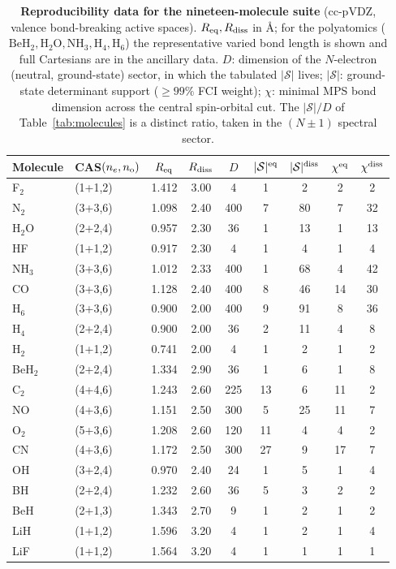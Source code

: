 \begin{table}[htbp]\centering\small
\caption{\textbf{Reproducibility data for the nineteen-molecule suite} (cc-pVDZ, valence bond-breaking
active spaces). $R_{\rm eq},R_{\rm diss}$ in \AA{}; for the polyatomics ($\mathrm{BeH_2},\mathrm{H_2O},
\mathrm{NH_3},\mathrm{H_4},\mathrm{H_6}$) the representative varied bond length is shown and full
Cartesians are in the ancillary data. $D$: dimension of the $N$-electron (neutral, ground-state) sector,
in which the tabulated $|\mathcal S|$ lives; $|\mathcal S|$: ground-state determinant support ($\ge99\%$
FCI weight); $\chi$: minimal MPS bond dimension across the central spin-orbital cut. The $|\mathcal S|/D$
of Table~\ref{tab:molecules} is a distinct ratio, taken in the $(N{\pm}1)$ spectral sector.}
\label{tab:repro}
\begin{tabular}{llccccccc}\hline\hline
Molecule & CAS$(n_e,n_{\rm o})$ & $R_{\rm eq}$ & $R_{\rm diss}$ & $D$ & $|\mathcal S|^{\rm eq}$ & $|\mathcal S|^{\rm diss}$ & $\chi^{\rm eq}$ & $\chi^{\rm diss}$ \\ \hline
F$_2$ & (1+1,2) & 1.412 & 3.00 & 4 & 1 & 2 & 2 & 2 \\
N$_2$ & (3+3,6) & 1.098 & 2.40 & 400 & 7 & 80 & 7 & 32 \\
H$_2$O & (2+2,4) & 0.957 & 2.30 & 36 & 1 & 13 & 1 & 13 \\
HF & (1+1,2) & 0.917 & 2.30 & 4 & 1 & 4 & 1 & 4 \\
NH$_3$ & (3+3,6) & 1.012 & 2.33 & 400 & 1 & 68 & 4 & 42 \\
CO & (3+3,6) & 1.128 & 2.40 & 400 & 8 & 46 & 14 & 30 \\
H$_6$ & (3+3,6) & 0.900 & 2.00 & 400 & 9 & 91 & 8 & 36 \\
H$_4$ & (2+2,4) & 0.900 & 2.00 & 36 & 2 & 11 & 4 & 8 \\
H$_2$ & (1+1,2) & 0.741 & 2.00 & 4 & 1 & 2 & 1 & 2 \\
BeH$_2$ & (2+2,4) & 1.334 & 2.90 & 36 & 1 & 6 & 1 & 8 \\
C$_2$ & (4+4,6) & 1.243 & 2.60 & 225 & 13 & 6 & 11 & 2 \\
NO & (4+3,6) & 1.151 & 2.50 & 300 & 5 & 25 & 11 & 7 \\
O$_2$ & (5+3,6) & 1.208 & 2.60 & 120 & 11 & 4 & 4 & 2 \\
CN & (4+3,6) & 1.172 & 2.50 & 300 & 27 & 9 & 17 & 7 \\
OH & (3+2,4) & 0.970 & 2.40 & 24 & 1 & 5 & 1 & 4 \\
BH & (2+2,4) & 1.232 & 2.60 & 36 & 5 & 3 & 2 & 2 \\
BeH & (2+1,3) & 1.343 & 2.70 & 9 & 1 & 2 & 1 & 2 \\
LiH & (1+1,2) & 1.596 & 3.20 & 4 & 1 & 2 & 1 & 4 \\
LiF & (1+1,2) & 1.564 & 3.20 & 4 & 1 & 1 & 1 & 1 \\
\hline\hline\end{tabular}
\end{table}
